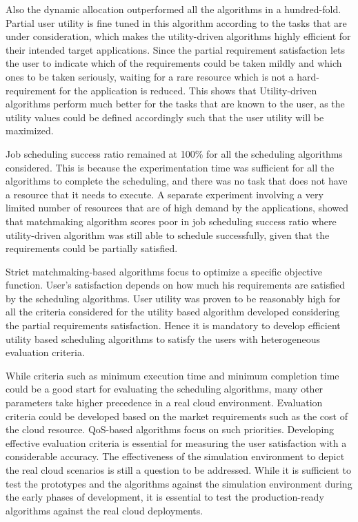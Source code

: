 \documentclass[times, 10pt,twocolumn]{article}
\begin{document}
Also the dynamic allocation outperformed all the algorithms in a hundred-fold. Partial user utility is fine tuned in this algorithm according to the tasks that are under consideration, which makes the utility-driven algorithms highly efficient for their intended target applications. Since the partial requirement satisfaction lets the user to indicate which of the requirements could be taken mildly and which ones to be taken seriously, waiting for a rare resource which is not a hard-requirement for the application is reduced. This shows that Utility-driven algorithms perform much better for the tasks that are known to the user, as the utility values could be defined accordingly such that the user utility will be maximized. 

Job scheduling success ratio remained at 100\% for all the scheduling algorithms considered. This is because the experimentation time was sufficient for all the algorithms to complete the scheduling, and there was no task that does not have a resource that it needs to execute. A separate experiment involving a very limited number of resources that are of high demand by the applications, showed that matchmaking algorithm scores poor in job scheduling success ratio where utility-driven algorithm was still able to schedule successfully, given that the requirements could be partially satisfied.

Strict matchmaking-based algorithms focus to optimize a specific objective function. User's satisfaction depends on how much his requirements are satisfied by the scheduling algorithms. User utility was proven to be reasonably high for all the criteria considered for the utility based algorithm developed considering the partial requirements satisfaction. Hence it is mandatory to develop efficient utility based scheduling algorithms to satisfy the users with heterogeneous evaluation criteria.

While criteria such as minimum execution time and minimum completion time could be a good start for evaluating the scheduling algorithms, many other parameters take higher precedence in a real cloud environment. Evaluation criteria could be developed based on the market requirements such as the cost of the cloud resource. QoS-based algorithms focus on such priorities. Developing effective evaluation criteria is essential for measuring the user satisfaction with a considerable accuracy. The effectiveness of the simulation environment to depict the real cloud scenarios is still a question to be addressed. While it is sufficient to test the prototypes and the algorithms against the simulation environment during the early phases of development, it is essential to test the production-ready algorithms against the real cloud deployments.
\end{document}
